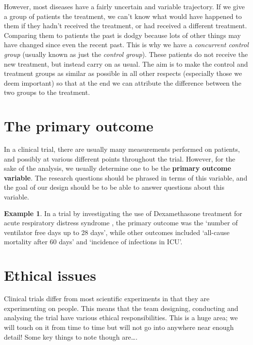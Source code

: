 \documentclass[
  openany]{book}
\theoremstyle{definition}
\theoremstyle{definition}
\newtheorem{example}{Example}[chapter]
\theoremstyle{definition}
\theoremstyle{definition}
\theoremstyle{remark}
\begin{document}
However, most diseases have a fairly uncertain and variable trajectory. If we give a group of patients the treatment, we can't know what would have happened to them if they hadn't received the treatment, or had received a different treatment. Comparing them to patients the past is dodgy because lots of other things may have changed since even the recent past. This is why we have a \emph{concurrent control group} (usually known as just the \emph{control group}). These patients do not receive the new treatment, but instead carry on as usual. The aim is to make the control and treatment groups as similar as possible in all other respects (especially those we deem important) so that at the end we can attribute the difference between the two groups to the treatment.

\hypertarget{primout}{%
\section{The primary outcome}\label{primout}}

In a clinical trial, there are usually many measurements performed on patients, and possibly at various different points throughout the trial. However, for the sake of the analysis, we usually determine one to be the \textbf{primary outcome variable}. The research questions should be phrased in terms of this variable, and the goal of our design should be to be able to answer questions about this variable.

\begin{example}
In a trial by \citet{villar2020dexamethasone} investigating the use of Dexamethasone treatment for acute respiratory distress syndrome , the primary outcome was the `number of ventilator free days up to 28 days', while other outcomes included `all-cause mortality after 60 days' and `incidence of infections in ICU'.
\end{example}

\hypertarget{ethical-issues}{%
\section{Ethical issues}\label{ethical-issues}}

Clinical trials differ from most scientific experiments in that they are experimenting on people. This means that the team designing, conducting and analysing the trial have various ethical responsibilities. This is a huge area; we will touch on it from time to time but will not go into anywhere near enough detail! Some key things to note though are\ldots.
\end{document}
